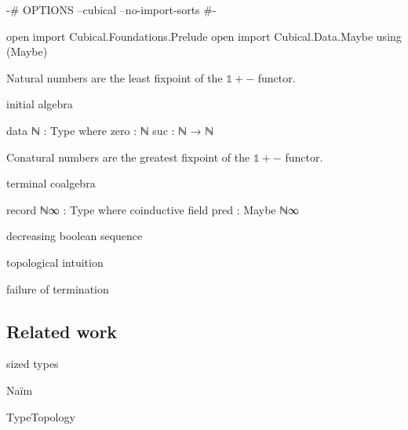 \begin{code}[hide]
{-# OPTIONS --cubical --no-import-sorts #-}

open import Cubical.Foundations.Prelude
open import Cubical.Data.Maybe using (Maybe)
\end{code}

Natural numbers are the least fixpoint of the $\mathbb{1} + {-}$ functor.

initial algebra

\begin{code}
data ℕ : Type where
  zero  : ℕ
  suc   : ℕ → ℕ
\end{code}

Conatural numbers are the greatest fixpoint of the $\mathbb{1} + {-}$ functor.

terminal coalgebra

\begin{code}
record ℕ∞ : Type where
  coinductive
  field
    pred : Maybe ℕ∞
\end{code}

decreasing boolean sequence

topological intuition

failure of termination

\subsection{Related work}

sized types

Naïm

TypeTopology
